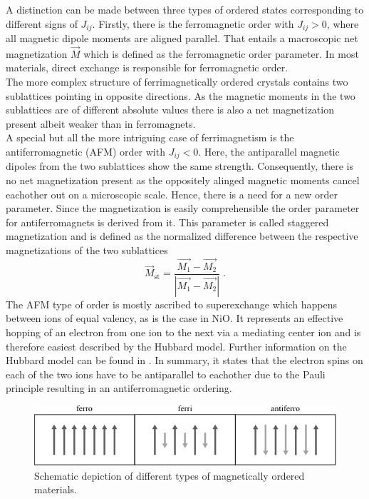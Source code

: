 A distinction can be made between three types of ordered states corresponding to different signs of $J_{ij}$.
Firstly, there is the ferromagnetic order with $J_{ij}>0$, where all magnetic dipole moments are aligned parallel.
That entails a macroscopic net magnetization $\vec{M}$ which is defined as the ferromagnetic order parameter.
In most materials, direct exchange is responsible for ferromagnetic order. \\
The more complex structure of ferrimagnetically ordered crystals contains two sublattices pointing in opposite directions.
As the magnetic moments in the two sublattices are of different absolute values there is also a net magnetization present albeit weaker than in ferromagnets. \\
A special but all the more intriguing case of ferrimagnetism is the antiferromagnetic (AFM) order with $J_{ij}<0$.
Here, the antiparallel magnetic dipoles from the two sublattices show the same strength.
Consequently, there is no net magnetization present as the oppositely alinged magnetic moments cancel eachother out on a microscopic scale.
Hence, there is a need for a new order parameter.
Since the magnetization is easily comprehensible
the order parameter for antiferromagnets is derived from it.
This parameter is called staggered magnetization and is defined as the normalized difference between the respective magnetizations of the two sublattices
\begin{equation}
    \vec{M}_{\text{st}} = \frac{\vec{M_1} - \vec{M_2}}{|\vec{M_1} - \vec{M_2}|} \;.
\end{equation}
The AFM type of order is mostly ascribed to superexchange which happens between ions of equal valency, as is the case in NiO.
It represents an effective hopping of an electron from one ion to the next via a mediating center ion and is therefore easiest described by the Hubbard model.
Further information on the Hubbard model can be found in .
In summary, it states that the electron spins on each of the two ions have to be antiparallel to eachother due to the Pauli principle resulting in an antiferromagnetic ordering.
\begin{figure}[ht]
    \centering
    \includegraphics[width=\textwidth]{pictures/magnetic_order.pdf}
    \caption{Schematic depiction of different types of magnetically ordered materials.}
    \label{fig:magnetic_order}
\end{figure}
